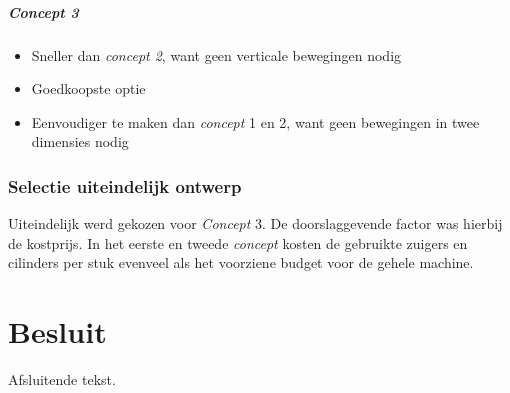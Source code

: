 \documentclass[a4paper,twoside,kulak]{kulakreport} %
\begin{document}
\paragraph{Concept 3}
\begin{itemize}
	\item Sneller dan \textit{concept 2}, want geen verticale bewegingen nodig
	\item Goedkoopste optie
	\item Eenvoudiger te maken dan \textit{concept} 1 en 2, want geen bewegingen in twee dimensies nodig
\end{itemize}

\subsection{Selectie uiteindelijk ontwerp}
Uiteindelijk werd gekozen voor \textit{Concept} 3. De doorslaggevende factor was hierbij de kostprijs. In het eerste en tweede \textit{concept} kosten de gebruikte zuigers en cilinders per stuk evenveel als het voorziene budget voor de gehele machine.





\chapter*{Besluit}
Afsluitende tekst.
\end{document}
